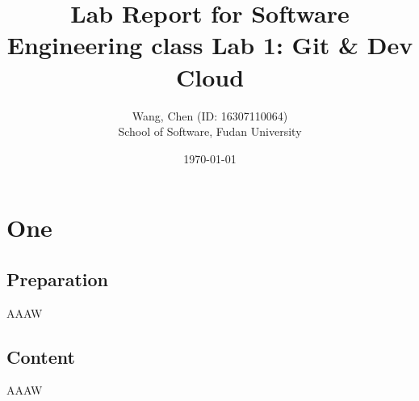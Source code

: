 \documentclass[a4paper]{report}
\title{Lab Report for Software Engineering class \newline
 Lab 1: Git \& Dev Cloud}
\author{Wang, Chen (ID: 16307110064) \\ School of Software, Fudan University}
\date{\today}
\begin{document}
\maketitle

\tableofcontents

\chapter{One}
\section{Preparation}
AAAW
\section{Content}

AAAW
\end{document}
